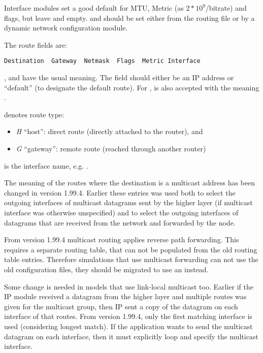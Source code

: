 Interface modules set a good default for MTU, Metric (as $2*10^9$/bitrate) and
flags, but leave  and  empty.  and
 should be set either from the routing file or by a dynamic network
configuration module.

The route fields are:

\begin{verbatim}
Destination  Gateway  Netmask  Flags  Metric Interface
\end{verbatim}

,  and  have the usual meaning.
The  field should either be an IP address or ``default''
(to designate the default route). For , \ttt{*} is also
accepted with the meaning .

 denotes route type:

\begin{itemize}
  \item \textit{H} ``host'': direct route (directly attached to the router), and
  \item \textit{G} ``gateway'': remote route (reached through another router)
\end{itemize}

 is the interface name, e.g. .

\begin{important}
The meaning of the routes where the destination is a multicast address
has been changed in version 1.99.4. Earlier these entries was used
both to select the outgoing interfaces of multicast datagrams
sent by the higher layer (if multicast interface was otherwise unspecified)
and to select the outgoing interfaces of datagrams that are received from
the network and forwarded by the node.

From version 1.99.4 multicast routing applies reverse path forwarding.
This requires a separate routing table, that can not be populated from
the old routing table entries. Therefore simulations that use multicast
forwarding can not use the old configuration files, they should be
migrated to use an  instead.

Some change is needed in models that use link-local multicast too.
Earlier if the IP module received a datagram from the higher layer
and multiple routes was given for the multicast group,
then IP sent a copy of the datagram on each interface of that routes.
From version 1.99.4, only the first matching interface is used (considering
longest match). If the application wants to send the multicast datagram
on each interface, then it must explicitly loop and specify the multicast
interface.
\end{important}

